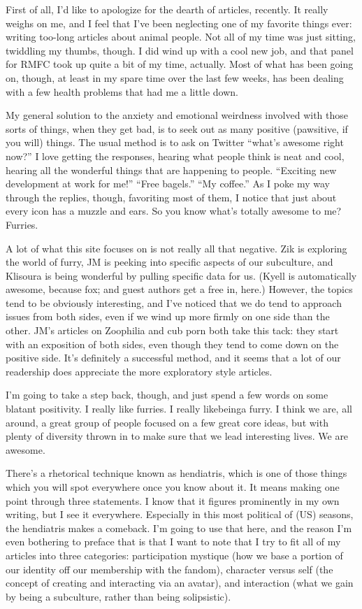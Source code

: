 First of all, I'd like to apologize for the dearth of articles, recently. It really weighs on me, and I feel that I've been neglecting one of my favorite things ever: writing too-long articles about animal people. Not all of my time was just sitting, twiddling my thumbs, though. I did wind up with a cool new job, and that panel for RMFC took up quite a bit of my time, actually. Most of what has been going on, though, at least in my spare time over the last few weeks, has been dealing with a few health problems that had me a little down.

My general solution to the anxiety and emotional weirdness involved with those sorts of things, when they get bad, is to seek out as many positive (pawsitive, if you will) things. The usual method is to ask on Twitter ``what's awesome right now?'' I love getting the responses, hearing what people think is neat and cool, hearing all the wonderful things that are happening to people. ``Exciting new development at work for me!'' ``Free bagels.'' ``My coffee.'' As I poke my way through the replies, though, favoriting most of them, I notice that just about every icon has a muzzle and ears. So you know what's totally awesome to me? Furries.

A lot of what this site focuses on is not really all that negative. Zik is exploring the world of furry, JM is peeking into specific aspects of our subculture, and Klisoura is being wonderful by pulling specific data for us. (Kyell is automatically awesome, because fox; and guest authors get a free in, here.) However, the topics tend to be obviously interesting, and I've noticed that we do tend to approach issues from both sides, even if we wind up more firmly on one side than the other. JM's articles on Zoophilia and cub porn both take this tack: they start with an exposition of both sides, even though they tend to come down on the positive side. It's definitely a successful method, and it seems that a lot of our readership does appreciate the more exploratory style articles.

I'm going to take a step back, though, and just spend a few words on some blatant positivity. I really like furries. I really likebeinga furry. I think we are, all around, a great group of people focused on a few great core ideas, but with plenty of diversity thrown in to make sure that we lead interesting lives. We are awesome.

There's a rhetorical technique known as hendiatris, which is one of those things which you will spot everywhere once you know about it. It means making one point through three statements. I know that it figures prominently in my own writing, but I see it everywhere. Especially in this most political of (US) seasons, the hendiatris makes a comeback. I'm going to use that here, and the reason I'm even bothering to preface that is that I want to note that I try to fit all of my articles into three categories: participation mystique (how we base a portion of our identity off our membership with the fandom), character versus self (the concept of creating and interacting via an avatar), and interaction (what we gain by being a subculture, rather than being solipsistic).

